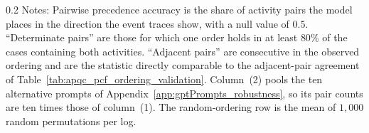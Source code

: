 \begin{table}[!t]
    \caption{Overlap Between GPT-Generated Orderings and Observed Process Execution}
    \label{tab:eventlog_ordering_validation}
    \begin{center}
    
    \end{center}
    \par\vspace{\fignotesskip}
\begin{minipage}{1\linewidth}
\begin{spacing}{0.2}
{\fontsize{9.5pt}{10pt}\selectfont Notes: Pairwise precedence accuracy is the share of activity pairs the model places in the direction the event traces show, with a null value of $0.5$.
``Determinate pairs'' are those for which one order holds in at least $80\%$ of the cases containing both activities.
``Adjacent pairs'' are consecutive in the observed ordering and are the statistic directly comparable to the adjacent-pair agreement of Table~\ref{tab:apqc_pcf_ordering_validation}.
Column~(2) pools the ten alternative prompts of Appendix~\ref{app:gptPrompts_robustness}, so its pair counts are ten times those of column~(1).
The random-ordering row is the mean of $1{,}000$ random permutations per log.}
\end{spacing}
\end{minipage}
\end{table}

